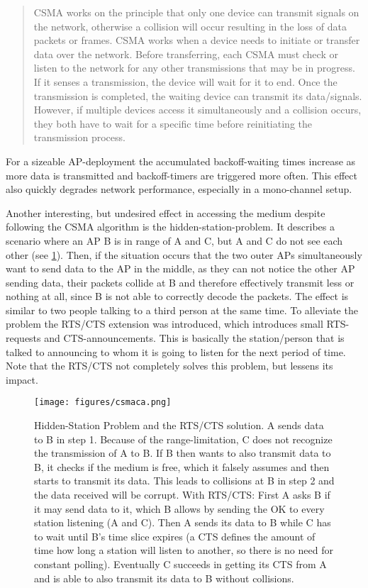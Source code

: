 	\begin{quotation}
	  CSMA works on the principle that only one device can transmit signals on the network, 
	  otherwise a collision will occur resulting in the loss of data packets or frames. 
	  CSMA works when a device needs to initiate or transfer data over the network. 
	  Before transferring, each CSMA must check or listen to the network for any other transmissions that may be in progress. 
	  If it senses a transmission, the device will wait for it to end. Once the transmission is completed, 
	  the waiting device can transmit its data/signals. However, if multiple devices access it simultaneously and a collision occurs, 
	  they both have to wait for a specific time before reinitiating the transmission process. 
	\end{quotation}
	
	For a sizeable \ac{AP}-deployment the accumulated backoff-waiting times increase as more data is transmitted and backoff-timers are triggered more often.
	This effect also quickly degrades network performance, especially in a mono-channel setup.
	
	Another interesting, but undesired effect in accessing the medium despite following the CSMA algorithm is the hidden-station-problem.
	It describes a scenario where an \ac{AP} B is in range of A and C, but A and C do not see each other (see \ref{fig:csmaca}).
	Then, if the situation occurs that the two outer APs simultaneously want to send data to the \ac{AP} in the middle, as they can not notice the 
	other AP sending data, their packets collide at B and therefore effectively transmit less or nothing at all, since B is not able to correctly decode the packets.
	The effect is similar to two people talking to a third person at the same time.
	To alleviate the problem the RTS/CTS extension was introduced, which introduces small \ac{RTS}-requests and \ac{CTS}-announcements. 
	This is basically the station/person that is talked to announcing to whom it is going to listen for the next period of time.
	Note that the RTS/CTS not completely solves this problem, but lessens its impact.
	
	\begin{figure}[th!]
	  \centering
	  \texttt{[image: figures/csmaca.png]}
	  \caption{Hidden-Station Problem and the RTS/CTS solution. A sends data to B in step 1.
	    Because of the range-limitation, C does not recognize the transmission of A to B. 
	    If B then wants to also transmit data to B, it checks if the medium is free, which it falsely assumes
	    and then starts to transmit its data. This leads to collisions at B in step 2 and the data received will be corrupt.
	    With RTS/CTS: First A asks B if it may send data to it, which B allows by sending the OK to every station listening (A and C). 
	    Then A sends its data to B while C has to wait until B's time slice expires (a CTS defines the amount of time how long a station will listen to another, so there is no
	    need for constant polling). Eventually C succeeds in getting its CTS from A and is able to also transmit its data to B without collisions.}
	  \label{fig:csmaca}
	\end{figure}

